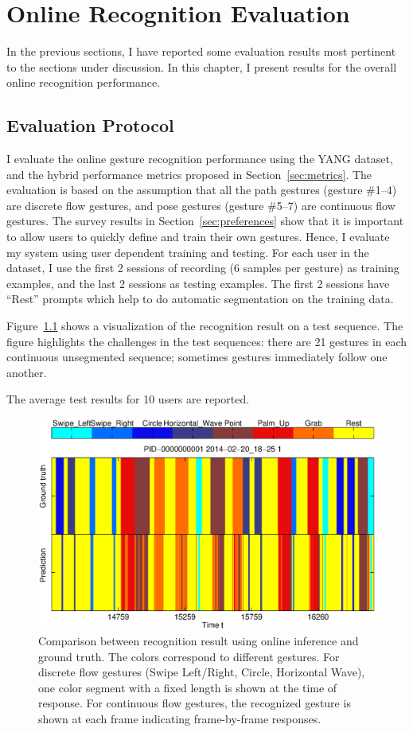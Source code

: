 \chapter{Online Recognition Evaluation}\label{sec:evaluation}
In the previous sections, I have reported some evaluation results most pertinent
to the sections under discussion. In this chapter, I present results
for the overall online recognition performance.

\section{Evaluation Protocol}
I evaluate the online gesture recognition performance using the YANG
dataset, and the hybrid performance
metrics proposed in Section~\ref{sec:metrics}. The evaluation is based on the
assumption that all the path gestures (gesture \#1--4) are
discrete flow gestures, and pose gestures (gesture \#5--7) are continuous flow
gestures.
The survey results in Section~\ref{sec:preferences} show that it is
important to allow users to quickly define and train their own gestures. Hence,
I evaluate my system using user dependent training and testing. For each user
in the dataset, I use the first 2 sessions of recording (6 samples per gesture)
as training examples, and the last 2 sessions as testing examples. The first 2
sessions have ``Rest'' prompts which help to do automatic segmentation on the
training data.

Figure~\ref{fig:recog-result} shows a visualization of the recognition result on
a test sequence. The figure highlights the challenges in the test sequences:
there are 21 gestures in each continuous unsegmented sequence; sometimes
gestures immediately follow one another.

The average test results for 10 users are reported.

\begin{figure}[thb]
\centering
\includegraphics[trim=10mm 5mm 10mm 5mm, clip,
width=\columnwidth]{figures/recog_result_m3.eps}
\caption{Comparison between recognition result using online inference
and ground truth.
The colors correspond to different gestures. For discrete flow gestures
(Swipe Left/Right, Circle, Horizontal Wave), one color segment with a fixed
length is shown at the time of response. For continuous flow gestures, the
recognized gesture is shown at each frame indicating frame-by-frame responses.}
\label{fig:recog-result}
\end{figure}

